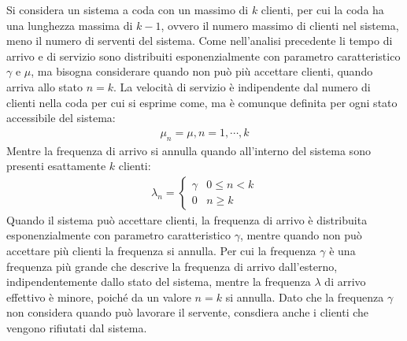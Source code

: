 \documentclass{article}
\numberwithin{equation}{subsection}
\begin{document}
Si considera un sistema a coda con un massimo di $k$ clienti, per cui la coda ha una lunghezza massima di $k-1$, ovvero il numero massimo di clienti nel sistema, meno il numero 
di serventi del sistema. Come nell'analisi precedente li tempo di arrivo e di servizio sono distribuiti esponenzialmente con parametro caratteristico $\gamma$ e $\mu$, ma 
bisogna considerare quando non può più accettare clienti, quando arriva allo stato $n=k$. La velocità di servizio è indipendente dal numero di clienti nella coda per cui si 
esprime come, ma è comunque definita per ogni stato accessibile del sistema: 
\begin{gather*}
    \mu_n=\mu,n=1,\cdots,k
\end{gather*}
Mentre la frequenza di arrivo si annulla quando all'interno del sistema sono presenti esattamente $k$ clienti:
\begin{gather*}
    \lambda_n=\begin{cases}
        \gamma&0\leq n<k\\
        0 &n\geq k
    \end{cases}
\end{gather*}
Quando il sistema può accettare clienti, la frequenza di arrivo è distribuita esponenzialmente con parametro caratteristico $\gamma$, mentre quando non può accettare più 
clienti la frequenza si annulla. Per cui la frequenza $\gamma$ è una frequenza più grande che descrive la frequenza di arrivo dall'esterno, indipendentemente dallo stato 
del sistema, mentre la frequenza $\lambda$ di arrivo effettivo è minore, poiché da un valore $n=k$ si annulla. Dato che la frequenza $\gamma$ non considera quando può lavorare 
il servente, consdiera anche i clienti che vengono rifiutati dal sistema. 
\end{document}
